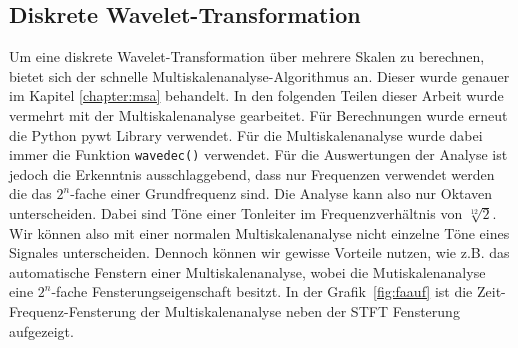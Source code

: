 \subsection{Diskrete Wavelet-Transformation}
 Um eine diskrete Wavelet-Transformation über mehrere Skalen zu berechnen, bietet sich der schnelle Multiskalenanalyse-Algorithmus an. Dieser wurde genauer im Kapitel \ref{chapter:msa} behandelt. In den folgenden Teilen dieser Arbeit wurde vermehrt mit der Multiskalenanalyse gearbeitet. Für Berechnungen wurde erneut die Python pywt Library verwendet. Für die Multiskalenanalyse wurde dabei immer die Funktion \texttt{wavedec()} verwendet. Für die Auswertungen der Analyse ist jedoch die Erkenntnis ausschlaggebend, dass nur Frequenzen verwendet werden die das $2^n$-fache einer Grundfrequenz sind. Die Analyse kann also nur Oktaven unterscheiden. Dabei sind Töne einer Tonleiter im Frequenzverhältnis von $\sqrt[12]{2}$. Wir können also mit einer normalen Multiskalenanalyse nicht einzelne Töne eines Signales unterscheiden. Dennoch können wir gewisse Vorteile nutzen, wie z.B. das automatische Fenstern einer Multiskalenanalyse, wobei die Mutiskalenanalyse eine $2^n$-fache Fensterungseigenschaft besitzt. In der Grafik~\ref{fig:faauf} ist die Zeit-Frequenz-Fensterung der Multiskalenanalyse neben der STFT Fensterung aufgezeigt. 
 


